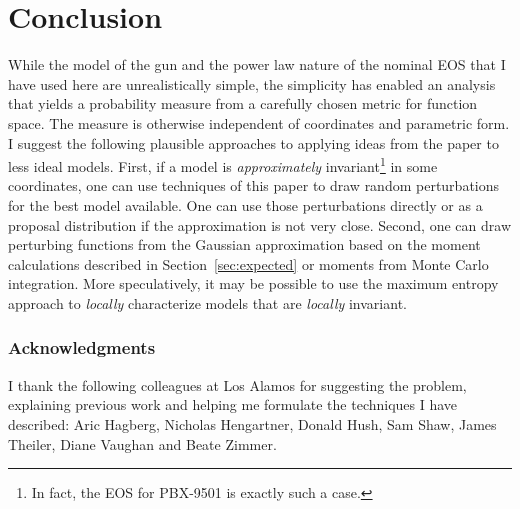\documentclass[]{article}
\begin{document}
\section{Conclusion}

While the model of the gun and the power law nature of the nominal EOS
that I have used here are unrealistically simple, the simplicity has
enabled an analysis that yields a probability measure from a carefully
chosen metric for function space.  The measure is otherwise
independent of coordinates and parametric form.  I suggest the
following plausible approaches to applying ideas from the paper to
less ideal models.  First, if a model is \emph{approximately}
invariant\footnote{In fact, the EOS for PBX-9501 is exactly such a
  case.} in some coordinates, one can use techniques of this paper to
draw random perturbations for the best model available.  One can use
those perturbations directly or as a proposal distribution if the
approximation is not very close.  Second, one can draw perturbing
functions from the Gaussian approximation based on the moment
calculations described in Section~\ref{sec:expected} or moments from
Monte Carlo integration.  More speculatively, it may be possible to
use the maximum entropy approach to \emph{locally} characterize models
that are \emph{locally} invariant.

\subsubsection*{Acknowledgments}
I thank the following colleagues at Los Alamos for suggesting the
problem, explaining previous work and helping me formulate the
techniques I have described: Aric Hagberg, Nicholas Hengartner, Donald
Hush, Sam Shaw, James Theiler, Diane Vaughan and Beate Zimmer.
 
\end{document}
